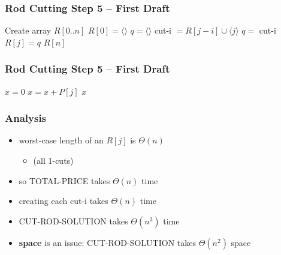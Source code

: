 \documentclass[10pt,aspectratio=169]{beamer}
\begin{document}
\begin{frame} \frametitle{Rod Cutting Step 5 -- First Draft}
  {\small
  \begin{algorithmic}[1]
    \State Create array $R[0..n]$ 
    \State $R[0] = \langle \rangle$ 
      \State $q= \langle \rangle $
        \State cut-i $= R[j-i] \cup \langle j \rangle$ 
          \State $q = $ cut-i
        \EndIf
      \EndFor
      \State $R[j] = q$
    \EndFor
    \State \Return $R[n]$
    \EndFunction
  \end{algorithmic}
  }
\end{frame}


\begin{frame} \frametitle{Rod Cutting Step 5 -- First Draft}
  {\small
  \begin{algorithmic}[1]
      \State $x = 0$
        \State $x = x + P[j]$
      \EndFor
      \State \Return $x$
    \EndFunction
  \end{algorithmic}
  }
\end{frame}

\begin{frame} \frametitle{Analysis}
\begin{itemize}
  \item worst-case length of an $R[j]$ is $\Theta(n)$
    \begin{itemize}
      \item (all 1-cuts)
    \end{itemize}
  \item so TOTAL-PRICE takes $\Theta(n)$ time
  \item creating each cut-i takes $\Theta(n)$ time
  \item CUT-ROD-SOLUTION takes $\Theta(n^3)$ time
  \item \textbf{space} is an issue: CUT-ROD-SOLUTION takes $\Theta(n^2)$ space
\end{itemize}
\end{frame}
\end{document}
